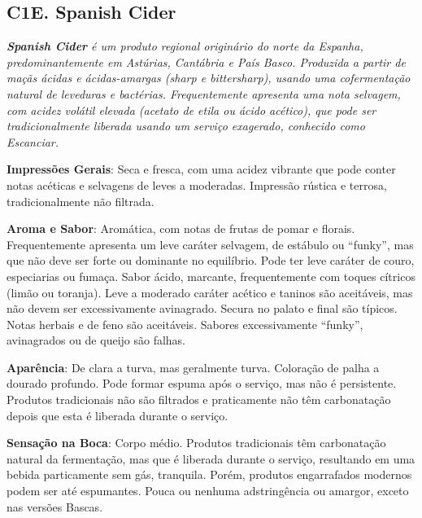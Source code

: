 \subsection*{C1E. Spanish Cider}

\textit{\textbf{Spanish Cider} é um produto regional originário do norte da Espanha, predominantemente em Astúrias, Cantábria e País Basco. Produzida a partir de maçãs ácidas e ácidas-amargas (\textit{sharp} e \textit{bittersharp}), usando uma cofermentação natural de leveduras e bactérias. Frequentemente apresenta uma nota selvagem, com acidez volátil elevada (acetato de etila ou ácido acético), que pode ser tradicionalmente liberada usando um serviço exagerado, conhecido como \textit{Escanciar}.}

\textbf{Impressões Gerais}: Seca e fresca, com uma acidez vibrante que pode conter notas acéticas e selvagens de leves a moderadas. Impressão rústica e terrosa, tradicionalmente não filtrada.

\textbf{Aroma e Sabor}: Aromática, com notas de frutas de pomar e florais. Frequentemente apresenta um leve caráter selvagem, de estábulo ou “funky”, mas que não deve ser forte ou dominante no equilíbrio. Pode ter leve caráter de couro, especiarias ou fumaça. Sabor ácido, marcante, frequentemente com toques cítricos (limão ou toranja). Leve a moderado caráter acético e taninos são aceitáveis, mas não devem ser excessivamente avinagrado. Secura no palato e final são típicos. Notas herbais e de feno são aceitáveis. Sabores excessivamente “funky”, avinagrados ou de queijo são falhas.

\textbf{Aparência}: De clara a turva, mas geralmente turva. Coloração de palha a dourado profundo. Pode formar espuma após o serviço, mas não é persistente. Produtos tradicionais não são filtrados e praticamente não têm carbonatação depois que esta é liberada durante o serviço.

\textbf{Sensação na Boca}: Corpo médio. Produtos tradicionais têm carbonatação natural da fermentação, mas que é liberada durante o serviço, resultando em uma bebida particamente sem gás, tranquila. Porém, produtos engarrafados modernos podem ser até espumantes. Pouca ou nenhuma adstringência ou amargor, exceto nas versões Bascas.

